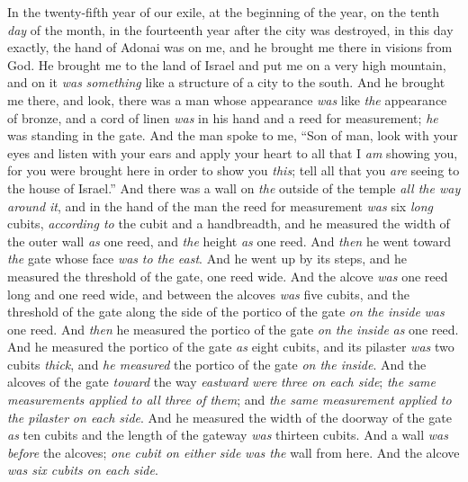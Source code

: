 \begin{biblechapter} %
 In the twenty-fifth year of our exile, at the beginning of the year, on the tenth \textit{day} of the month, in the fourteenth year after the city was destroyed, in this day exactly, the hand of Adonai was on me, and he brought me there
\verse in visions from God. He brought me to the land of Israel and put me on a very high mountain, and on it \textit{was} \textit{something} like a structure of a city to the south.
\verse And he brought me there, and look, there was a man whose appearance \textit{was} like \textit{the} appearance of bronze, and a cord of linen \textit{was} in his hand and a reed for measurement; \textit{he} was standing in the gate.
\verse And the man spoke to me, “Son of man, look with your eyes and listen with your ears and apply your heart to all that I \textit{am} showing you, for you were brought here in order to show you \textit{this}; tell all that you \textit{are} seeing to the house of Israel.”
 And there was a wall on \textit{the} outside of the temple \textit{all the way around it}, and in the hand of the man the reed for measurement \textit{was} six \textit{long} cubits, \textit{according to} the cubit and a handbreadth, and he measured the width of the outer wall \textit{as} one reed, and \textit{the} height \textit{as} one reed.
\verse And \textit{then} he went toward \textit{the} gate whose face \textit{was} \textit{to the east}. And he went up by its steps, and he measured the threshold of the gate, one reed wide.
\verse And the alcove \textit{was} one reed long and one reed wide, and between the alcoves \textit{was} five cubits, and the threshold of the gate along the side of the portico of the gate \textit{on the inside} \textit{was} one reed.
\verse And \textit{then} he measured the portico of the gate \textit{on the inside} \textit{as} one reed.
\verse And he measured the portico of the gate \textit{as} eight cubits, and its pilaster \textit{was} two cubits \textit{thick}, and \textit{he measured} the portico of the gate \textit{on the inside}.
\verse And the alcoves of the gate \textit{toward} the way \textit{eastward} \textit{were} \textit{three on each side}; \textit{the same measurements applied to all three of them}; and \textit{the same measurement applied to the pilaster} \textit{on each side}.
\verse And he measured the width of the doorway of the gate \textit{as} ten cubits and the length of the gateway \textit{was} thirteen cubits.
\verse And a wall \textit{was before} the alcoves; \textit{one cubit on either side} \textit{was the} wall from here. And the alcove \textit{was six cubits on each side}.

\end{biblechapter}
